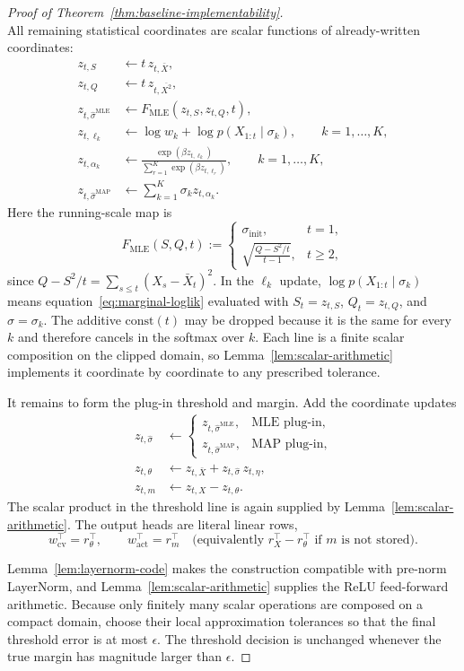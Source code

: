 \documentclass[11pt]{article}
\begin{document}
\begin{proof}[Proof of Theorem~\ref{thm:baseline-implementability}]
\[\]
All remaining statistical coordinates are scalar functions of already-written coordinates:
\[
\begin{aligned}
z_{t,S} &\leftarrow t\,z_{t,\bar X},\\
z_{t,Q} &\leftarrow t\,z_{t,\overline{X^2}},\\
z_{t,\widehat\sigma^{\mathrm{MLE}}}
&\leftarrow F_{\mathrm{MLE}}(z_{t,S},z_{t,Q},t),\\
z_{t,\ell_k}
&\leftarrow \log w_k+\log p(X_{1:t}\mid\sigma_k),
\qquad k=1,\ldots,K,\\
z_{t,\alpha_k}
&\leftarrow
\frac{\exp(\beta z_{t,\ell_k})}{\sum_{r=1}^K\exp(\beta z_{t,\ell_r})},
\qquad k=1,\ldots,K,\\
z_{t,\widehat\sigma^{\mathrm{MAP}}}
&\leftarrow \sum_{k=1}^K\sigma_k z_{t,\alpha_k}.
\end{aligned}
\]
Here the running-scale map is
\[
F_{\mathrm{MLE}}(S,Q,t)
:=
\begin{cases}
\sigma_{\mathrm{init}}, & t=1,\\[0.35em]
\displaystyle
\sqrt{\frac{Q-S^2/t}{t-1}}, & t\ge2,
\end{cases}
\]
since \(Q-S^2/t=\sum_{s\le t}(X_s-\bar X_t)^2\). In the \(\ell_k\) update, \(\log p(X_{1:t}\mid\sigma_k)\) means equation~\eqref{eq:marginal-loglik} evaluated with \(S_t=z_{t,S}\), \(Q_t=z_{t,Q}\), and \(\sigma=\sigma_k\). The additive \(\mathrm{const}(t)\) may be dropped because it is the same for every \(k\) and therefore cancels in the softmax over \(k\). Each line is a finite scalar composition on the clipped domain, so Lemma~\ref{lem:scalar-arithmetic} implements it coordinate by coordinate to any prescribed tolerance.

It remains to form the plug-in threshold and margin. Add the coordinate updates
\[
\begin{aligned}
z_{t,\widehat\sigma}
&\leftarrow
\begin{cases}
z_{t,\widehat\sigma^{\mathrm{MLE}}}, & \text{MLE plug-in},\\
z_{t,\widehat\sigma^{\mathrm{MAP}}}, & \text{MAP plug-in},
\end{cases}\\
z_{t,\theta}
&\leftarrow z_{t,\bar X}+z_{t,\widehat\sigma}\,z_{t,\eta},\\
z_{t,m}
&\leftarrow z_{t,X}-z_{t,\theta}.
\end{aligned}
\]
The scalar product in the threshold line is again supplied by Lemma~\ref{lem:scalar-arithmetic}. The output heads are literal linear rows,
\[
w_{\mathrm{cv}}^\top=r_\theta^\top,\qquad
w_{\mathrm{act}}^\top=r_m^\top
\quad
\text{(equivalently \(r_X^\top-r_\theta^\top\) if \(m\) is not stored).}
\]

Lemma~\ref{lem:layernorm-code} makes the construction compatible with pre-norm LayerNorm, and Lemma~\ref{lem:scalar-arithmetic} supplies the ReLU feed-forward arithmetic. Because only finitely many scalar operations are composed on a compact domain, choose their local approximation tolerances so that the final threshold error is at most \(\epsilon\). The threshold decision is unchanged whenever the true margin has magnitude larger than \(\epsilon\).
\end{proof}
\end{document}
